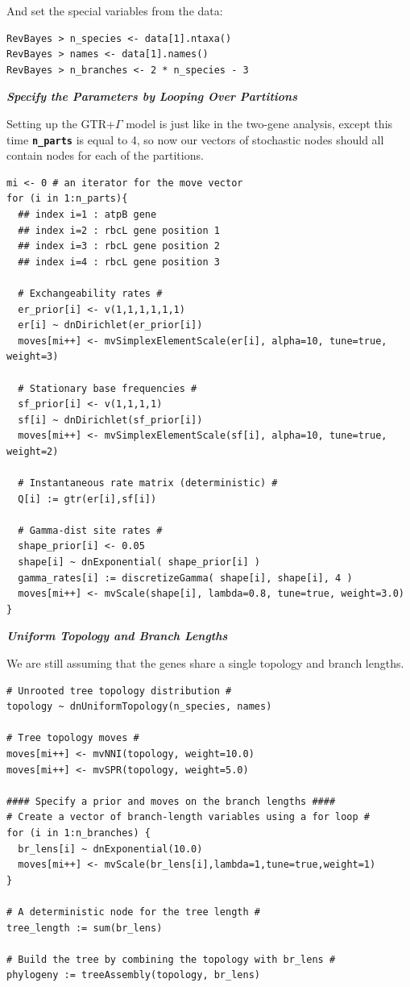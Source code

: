 \documentclass[11pt]{article}
\newcommand{\cl}[1]{{\texttt{\textbf{#1}}}}
\begin{document}
And set the special variables from the data:
{\tt \begin{snugshade*}
\begin{lstlisting}
RevBayes > n_species <- data[1].ntaxa()
RevBayes > names <- data[1].names()
RevBayes > n_branches <- 2 * n_species - 3
\end{lstlisting}
\end{snugshade*}}




\textbf{\textit{Specify the Parameters by Looping Over Partitions}}

Setting up the GTR+$\Gamma$ model is just like in the two-gene analysis, except this time \cl{n\_parts} is equal to 4, so now our vectors of stochastic nodes should all contain nodes for each of the partitions.
{\tt \small \begin{snugshade*}
\begin{lstlisting}
mi <- 0 # an iterator for the move vector
for (i in 1:n_parts){
  ## index i=1 : atpB gene
  ## index i=2 : rbcL gene position 1
  ## index i=3 : rbcL gene position 2
  ## index i=4 : rbcL gene position 3

  # Exchangeability rates #
  er_prior[i] <- v(1,1,1,1,1,1)
  er[i] ~ dnDirichlet(er_prior[i])
  moves[mi++] <- mvSimplexElementScale(er[i], alpha=10, tune=true, weight=3) 

  # Stationary base frequencies #
  sf_prior[i] <- v(1,1,1,1)
  sf[i] ~ dnDirichlet(sf_prior[i])
  moves[mi++] <- mvSimplexElementScale(sf[i], alpha=10, tune=true, weight=2) 

  # Instantaneous rate matrix (deterministic) #
  Q[i] := gtr(er[i],sf[i]) 

  # Gamma-dist site rates #
  shape_prior[i] <- 0.05 
  shape[i] ~ dnExponential( shape_prior[i] )
  gamma_rates[i] := discretizeGamma( shape[i], shape[i], 4 )
  moves[mi++] <- mvScale(shape[i], lambda=0.8, tune=true, weight=3.0)
}
\end{lstlisting}
\end{snugshade*}}


\textbf{\textit{Uniform Topology and Branch Lengths}}

We are still assuming that the genes share a single topology and branch lengths.
{\tt \begin{snugshade*}
\begin{lstlisting}
# Unrooted tree topology distribution #
topology ~ dnUniformTopology(n_species, names)

# Tree topology moves #
moves[mi++] <- mvNNI(topology, weight=10.0)
moves[mi++] <- mvSPR(topology, weight=5.0)

#### Specify a prior and moves on the branch lengths #### 
# Create a vector of branch-length variables using a for loop #
for (i in 1:n_branches) {
  br_lens[i] ~ dnExponential(10.0)
  moves[mi++] <- mvScale(br_lens[i],lambda=1,tune=true,weight=1) 
}

# A deterministic node for the tree length #
tree_length := sum(br_lens)

# Build the tree by combining the topology with br_lens #
phylogeny := treeAssembly(topology, br_lens)
\end{lstlisting}
\end{snugshade*}}
\end{document}
